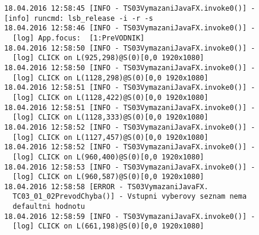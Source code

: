 {\lstset{basicstyle=\ttfamily\footnotesize}
		\begin{lstlisting}[]
18.04.2016 12:58:45 [INFO - TS03VymazaniJavaFX.invoke0()] -
[info] runcmd: lsb_release -i -r -s
18.04.2016 12:58:46 [INFO - TS03VymazaniJavaFX.invoke0()] -
  [log] App.focus:  [1:PreVODNIK]
18.04.2016 12:58:50 [INFO - TS03VymazaniJavaFX.invoke0()] -
  [log] CLICK on L(925,298)@S(0)[0,0 1920x1080]
18.04.2016 12:58:50 [INFO - TS03VymazaniJavaFX.invoke0()] -
  [log] CLICK on L(1128,298)@S(0)[0,0 1920x1080]
18.04.2016 12:58:51 [INFO - TS03VymazaniJavaFX.invoke0()] -
  [log] CLICK on L(1128,422)@S(0)[0,0 1920x1080]
18.04.2016 12:58:51 [INFO - TS03VymazaniJavaFX.invoke0()] -
  [log] CLICK on L(1128,333)@S(0)[0,0 1920x1080]
18.04.2016 12:58:52 [INFO - TS03VymazaniJavaFX.invoke0()] -
  [log] CLICK on L(1127,457)@S(0)[0,0 1920x1080]
18.04.2016 12:58:52 [INFO - TS03VymazaniJavaFX.invoke0()] -
  [log] CLICK on L(960,400)@S(0)[0,0 1920x1080]
18.04.2016 12:58:53 [INFO - TS03VymazaniJavaFX.invoke0()] -
  [log] CLICK on L(960,587)@S(0)[0,0 1920x1080]
18.04.2016 12:58:58 [ERROR - TS03VymazaniJavaFX.
  TC03_01_02PrevodChyba()] - Vstupni vyberovy seznam nema
  defaultni hodnotu
18.04.2016 12:58:59 [INFO - TS03VymazaniJavaFX.invoke0()] -
  [log] CLICK on L(661,198)@S(0)[0,0 1920x1080]
	\end{lstlisting}}